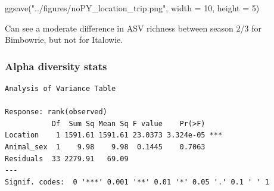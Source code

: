 \documentclass[
  letterpaper,
  DIV=11,
  numbers=noendperiod]{scrartcl}
\newenvironment{Shaded}{\begin{snugshade}}{\end{snugshade}}
\newcommand{\AttributeTok}[1]{\textcolor[rgb]{0.40,0.45,0.13}{#1}}
\newcommand{\CommentTok}[1]{\textcolor[rgb]{0.37,0.37,0.37}{#1}}
\newcommand{\DecValTok}[1]{\textcolor[rgb]{0.68,0.00,0.00}{#1}}
\newcommand{\DocumentationTok}[1]{\textcolor[rgb]{0.37,0.37,0.37}{\textit{#1}}}
\newcommand{\FunctionTok}[1]{\textcolor[rgb]{0.28,0.35,0.67}{#1}}
\newcommand{\NormalTok}[1]{\textcolor[rgb]{0.00,0.23,0.31}{#1}}
\newcommand{\OtherTok}[1]{\textcolor[rgb]{0.00,0.23,0.31}{#1}}
\newcommand{\SpecialCharTok}[1]{\textcolor[rgb]{0.37,0.37,0.37}{#1}}
\newcommand{\StringTok}[1]{\textcolor[rgb]{0.13,0.47,0.30}{#1}}
\begin{document}
\begin{Shaded}
\begin{Highlighting}[]
\FunctionTok{ggsave}\NormalTok{(}\StringTok{"../figures/noPY\_location\_trip.png"}\NormalTok{, }\AttributeTok{width =} \DecValTok{10}\NormalTok{, }\AttributeTok{height =} \DecValTok{5}\NormalTok{)}
\end{Highlighting}
\end{Shaded}

Can see a moderate difference in ASV richness between season 2/3 for
Bimbowrie, but not for Italowie.

\subsubsection{Alpha diversity stats}\label{alpha-diversity-stats}

\begin{Shaded}
\end{Shaded}

\begin{verbatim}
Analysis of Variance Table

Response: rank(observed)
           Df  Sum Sq Mean Sq F value    Pr(>F)    
Location    1 1591.61 1591.61 23.0373 3.324e-05 ***
Animal_sex  1    9.98    9.98  0.1445    0.7063    
Residuals  33 2279.91   69.09                      
---
Signif. codes:  0 '***' 0.001 '**' 0.01 '*' 0.05 '.' 0.1 ' ' 1
\end{verbatim}
\end{document}

